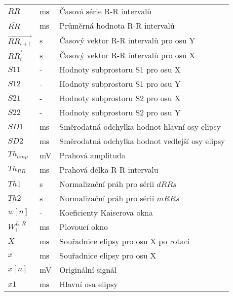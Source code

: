\begin{table}[H]
\begin{center}
\begin{tabular}{p{2.5cm}p{2.5cm}p{8.25cm}}
			$RR$                        & ms       & Časová série R-R intervalů                     \\
			$\overline{RR}$             & ms       & Průměrná hodnota R-R intervalů                 \\
			$\overrightarrow{RR_{i+1}}$ & s        & Časový vektor R-R intervalů pro osu Y          \\
			$\overrightarrow{RR_i}$     & s        & Časový vektor R-R intervalů pro osu X          \\
			$S11$                       & -        & Hodnoty subprostoru S1 pro osu X               \\
			$S12$                       & -        & Hodnoty subprostoru S1 pro osu Y               \\
			$S21$                       & -        & Hodnoty subprostoru S2 pro osu X               \\
			$S22$                       & -        & Hodnoty subprostoru S2 pro osu Y               \\
			$SD1$                       & ms       & Směrodatná odchylka hodnot hlavní osy elipsy   \\
			$SD2$                       & ms       & Směrodatná odchylka hodnot vedlejší osy elipsy \\
			$Th_{amp}$                  & mV       & Prahová amplituda                              \\
			$Th_{RR}$                   & ms       & Prahová délka R-R intervalu                    \\
			$Th1$                       & s        & Normalizační práh pro sérii $dRRs$             \\
			$Th2$                       & s        & Normalizační práh pro sérii $mRRs$             \\
			$w[n]$                      & -        & Koeficienty Kaiserova okna                     \\
			$W_i^{L,R}$                 & ms       & Plovoucí okno                                  \\
			$X$                         & ms       & Souřadnice elipsy pro osu X po rotaci          \\
			$x$                         & ms       & Souřadnice elipsy pro osu X                    \\
			$x[n]$                      & mV       & Originální signál                              \\
			$x1$                        & ms       & Hlavní osa elipsy                              \\

\end{tabular}
\end{center}
\end{table}
